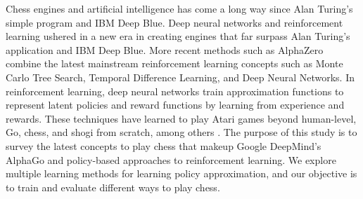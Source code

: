 \documentclass[12pt]{turabian-researchpaper}
\begin{document}
Chess engines and artificial intelligence has come a long way since Alan Turing’s simple program and IBM Deep Blue. Deep neural networks and reinforcement learning ushered in a new era in creating engines that far surpass Alan Turing’s application and IBM Deep Blue. More recent methods such as AlphaZero combine the latest mainstream reinforcement learning concepts such as Monte Carlo Tree Search, Temporal Difference Learning, and Deep Neural Networks. In reinforcement learning, deep neural networks train approximation functions to represent latent policies and reward functions by learning from experience and rewards. These techniques have learned to play Atari games beyond human-level, Go, chess, and shogi from scratch, among others \parencite{srinivasan_actor-critic_2018}. The purpose of this study is to survey the latest concepts to play chess that makeup Google DeepMind’s AlphaGo and policy-based approaches to reinforcement learning. We explore multiple learning methods for learning policy approximation, and our objective is to train and evaluate different ways to play chess.


\end{document}
